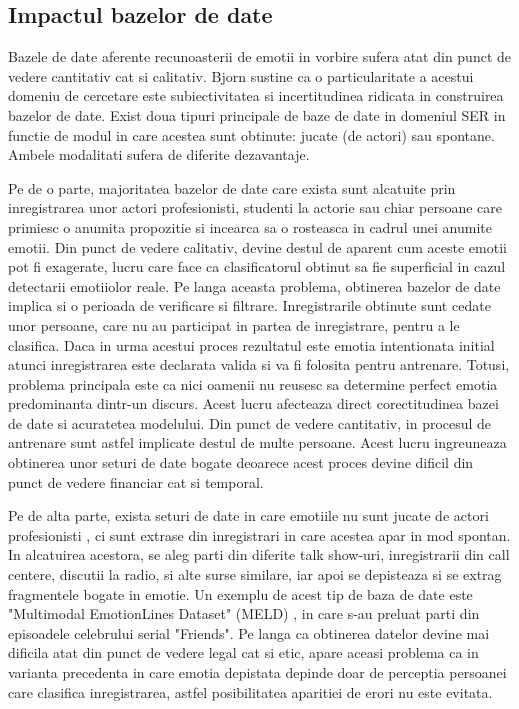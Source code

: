 \documentclass[a4paper,12pt, twoside]{book}
\begin{document}
				\subsection{Impactul bazelor de date}
					Bazele de date aferente recunoasterii de emotii in vorbire sufera atat din punct de vedere cantitativ cat si calitativ. Bjorn \cite{bjorn1} sustine ca o particularitate a acestui domeniu de cercetare este subiectivitatea si incertitudinea ridicata in construirea bazelor de date. Exist doua tipuri principale de baze de date in domeniul SER in functie de modul in care acestea sunt obtinute: jucate (de actori) sau spontane. Ambele modalitati sufera de diferite dezavantaje. \par
					Pe de o parte, majoritatea bazelor de date care exista sunt alcatuite prin inregistrarea unor actori profesionisti, studenti la actorie sau chiar persoane care primiesc o anumita propozitie si incearca sa o rosteasca in cadrul unei anumite emotii. Din punct de vedere calitativ, devine destul de aparent cum aceste emotii pot fi exagerate, lucru care face ca clasificatorul obtinut sa fie superficial in cazul detectarii emotiiolor reale. Pe langa aceasta problema, obtinerea bazelor de date implica si o perioada de verificare si filtrare. Inregistrarile obtinute sunt cedate unor persoane, care nu au participat in partea de inregistrare, pentru a le clasifica. Daca in urma acestui proces rezultatul este emotia intentionata initial atunci inregistrarea este declarata valida si va fi folosita pentru antrenare. Totusi, problema principala este ca nici oamenii nu reusesc sa determine perfect emotia predominanta dintr-un discurs. Acest lucru afecteaza direct corectitudinea bazei de date si acuratetea modelului. Din punct de vedere cantitativ, in procesul de antrenare sunt astfel implicate destul de multe persoane. Acest lucru ingreuneaza obtinerea unor seturi de date bogate deoarece acest proces devine dificil din punct de vedere financiar cat si temporal.\par
					Pe de alta parte, exista seturi de date in care emotiile nu sunt jucate de actori profesionisti , ci sunt extrase din inregistrari in care acestea apar in mod spontan. In alcatuirea acestora, se aleg parti din diferite talk show-uri, inregistrarii din call centere, discutii la radio, si alte surse similare, iar apoi se depisteaza si se extrag fragmentele bogate in emotie. Un exemplu de acest tip de baza de date este "Multimodal EmotionLines Dataset" (MELD) \cite{meld}, in care s-au preluat parti din episoadele celebrului serial "Friends". Pe langa ca obtinerea datelor devine mai dificila atat din punct de vedere legal cat si etic, apare aceasi problema ca in varianta precedenta in care emotia depistata depinde doar de perceptia persoanei care clasifica inregistrarea, astfel posibilitatea aparitiei de erori nu este evitata. \par
\end{document}
